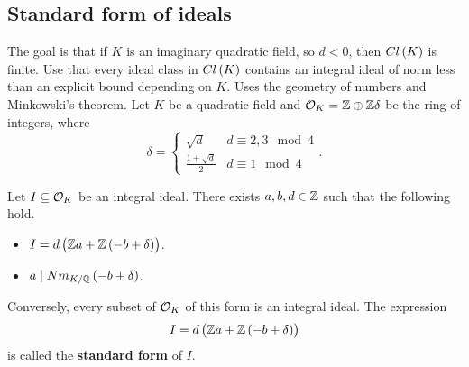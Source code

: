 \pagebreak

\subsection{Standard form of ideals}

The goal is that if $ K $ is an imaginary quadratic field, so $ d < 0 $, then $ Cl\br{K} $ is finite. Use that every ideal class in $ Cl\br{K} $ contains an integral ideal of norm less than an explicit bound depending on $ K $. Uses the geometry of numbers and Minkowski's theorem. Let $ K $ be a quadratic field and $ \mathcal{O}_K = \mathbb{Z} \oplus \mathbb{Z}\delta $ be the ring of integers, where
$$ \delta =
\begin{cases}
\sqrt{d} & d \equiv 2, 3 \mod 4 \\
\tfrac{1 + \sqrt{d}}{2} & d \equiv 1 \mod 4
\end{cases}.
$$

\begin{proposition}
Let $ I \subseteq \mathcal{O}_K $ be an integral ideal. There exists $ a, b, d \in \mathbb{Z} $ such that the following hold.
\begin{itemize}
\item $ I = d\br{\Z a + \Z\br{-b + \delta}} $.
\item $ a \mid Nm_{K / \Q}\br{-b + \delta} $.
\end{itemize}
\end{proposition}

Conversely, every subset of $ \mathcal{O}_K $ of this form is an integral ideal. The expression
$$ I = d\br{\Z a + \Z\br{-b + \delta}} $$
is called the \textbf{standard form} of $ I $.


